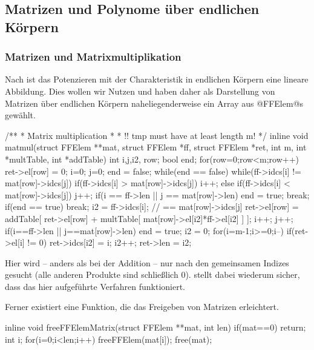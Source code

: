 \subsection{Matrizen und Polynome über endlichen Körpern}

\subsubsection{Matrizen und Matrixmultiplikation}

Nach  ist das Potenzieren mit der Charakteristik in
endlichen Körpern eine lineare Abbildung. Dies wollen wir Nutzen und haben
daher als Darstellung von Matrizen über endlichen Körpern naheliegenderweise
ein Array aus @FFElem@s gewählt.

\begin{ccode}[caption={Aus \url{../Sage/enumeratePCNs.c}}]
/**
 * Matrix multiplication
 *
 * !! tmp must have at least length m!
 */
inline void matmul(struct FFElem **mat, struct FFElem *ff,
        struct FFElem *ret, 
        int m, int *multTable, int *addTable){
    int i,j,i2, row;
    bool end;
    for(row=0;row<m;row++){
        ret->el[row] = 0;
        i=0; j=0;
        end = false;
        while(end == false){
            while(ff->idcs[i] != mat[row]->idcs[j]){
                if(ff->idcs[i] > mat[row]->idcs[j]) i++;
                else if(ff->idcs[i] < mat[row]->idcs[j]) j++;
                if(i == ff->len || j == mat[row]->len){
                    end = true;
                    break;
                }
            }
            if(end == true) break;
            i2 = ff->idcs[i]; // == mat[row]->idcs[j]
            ret->el[row] = addTable[ ret->el[row] 
                + multTable[ mat[row]->el[i2]*ff->el[i2] ] ];
            i++;
            j++;
            if(i==ff->len || j==mat[row]->len) end = true;
        }
    }
    i2 = 0;
    for(i=m-1;i>=0;i--){
        if(ret->el[i] != 0){
            ret->idcs[i2] = i;
            i2++;
        }
    }
    ret->len = i2;
}
\end{ccode}

Hier wird -- anders als bei der Addition -- nur nach den gemeinsamen Indizes
gesucht (alle anderen Produkte sind schließlich 0). 
 stellt dabei wiederum sicher, dass das hier
aufgeführte Verfahren funktioniert.

Ferner existiert eine Funktion, die das Freigeben von Matrizen erleichtert.

\begin{ccode}[caption={Aus \url{../Sage/enumeratePCNs.c}}]
inline void freeFFElemMatrix(struct FFElem **mat, int len){
    if(mat==0) return;
    int i;
    for(i=0;i<len;i++) freeFFElem(mat[i]);
    free(mat);
}
\end{ccode}



